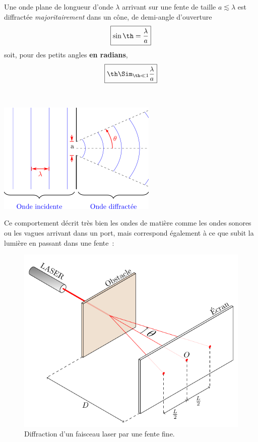 \documentclass[../../main/main.tex]{subfiles}
\begin{document}
\noindent
\begin{minipage}[t]{.5\linewidth}
	Une onde plane de longueur d'onde $\lambda$ arrivant sur une fente de taille
	$a \lesssim \lambda$ est diffractée \textit{majoritairement} dans un cône, de
	demi-angle d'ouverture
	\[
		\boxed{\sin{\th} = \frac{\lambda}{a}}
	\]
	soit, pour des petits angles \textbf{en radians},
	\[
		\boxed{\th \Sim_{\th \ll 1} \frac{\lambda}{a}}
	\]
\end{minipage}
\hfill
\begin{minipage}[t]{.45\linewidth}
	~
	\vspace*{-10pt}
	\begin{center}
		\includegraphics[width=.7\linewidth]{diff1d}
		\label{fig:diff1d}
	\end{center}
\end{minipage}

Ce comportement décrit très bien les ondes de matière comme les ondes sonores ou
les vagues arrivant dans un port, mais correspond également à ce que subit la
lumière en passant dans une fente~:
\begin{figure}[h]
	\centering
	\includegraphics[width=.5\linewidth]{diffraction}
	\caption{Diffraction d'un faisceau laser par une fente fine.}
	\label{fig:diff_las}
\end{figure}
\end{document}
